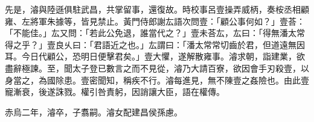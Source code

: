 \begin{pinyinscope}
 
 
 
 先是，濬與陸遜俱駐武昌，共掌留事，還復故。時校事呂壹操弄威柄，奏桉丞相顧雍、左將軍朱據等，皆見禁止。黃門侍郎謝厷語次問壹：「顧公事何如？」壹荅：「不能佳。」厷又問：「若此公免退，誰當代之？」壹未荅厷，厷曰：「得無潘太常得之乎？」壹良乆曰：「君語近之也。」厷謂曰：「潘太常常切齒於君，但道遠無因耳。今日代顧公，恐明日便擊君矣。」壹大懼，遂解散雍事。濬求朝，詣建業，欲盡辭極諫。至，聞太子登已數言之而不見從，濬乃大請百寮，欲因會手刃殺壹，以身當之，為國除患。壹密聞知，稱疾不行。濬每進見，無不陳壹之姦險也。由此壹寵漸衰，後遂誅戮。權引咎責躬，因誚讓大臣，語在權傳。
 
 
赤烏二年，濬卒，子翥嗣。濬女配建昌侯孫慮。
 
 
\end{pinyinscope}